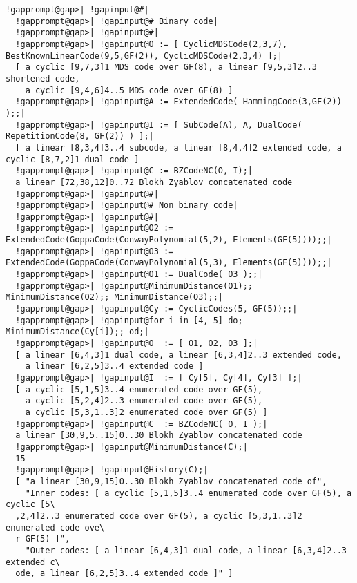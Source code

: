 \documentclass[a4paper,11pt]{report}
\begin{document}
{{ 
\begin{Verbatim}[commandchars=!@|,fontsize=\small,frame=single,label=Example]
  !gapprompt@gap>| !gapinput@#|
  !gapprompt@gap>| !gapinput@# Binary code|
  !gapprompt@gap>| !gapinput@#|
  !gapprompt@gap>| !gapinput@O := [ CyclicMDSCode(2,3,7), BestKnownLinearCode(9,5,GF(2)), CyclicMDSCode(2,3,4) ];|
  [ a cyclic [9,7,3]1 MDS code over GF(8), a linear [9,5,3]2..3 shortened code, 
    a cyclic [9,4,6]4..5 MDS code over GF(8) ]
  !gapprompt@gap>| !gapinput@A := ExtendedCode( HammingCode(3,GF(2)) );;|
  !gapprompt@gap>| !gapinput@I := [ SubCode(A), A, DualCode( RepetitionCode(8, GF(2)) ) ];|
  [ a linear [8,3,4]3..4 subcode, a linear [8,4,4]2 extended code, a cyclic [8,7,2]1 dual code ]
  !gapprompt@gap>| !gapinput@C := BZCodeNC(O, I);|
  a linear [72,38,12]0..72 Blokh Zyablov concatenated code
  !gapprompt@gap>| !gapinput@#|
  !gapprompt@gap>| !gapinput@# Non binary code|
  !gapprompt@gap>| !gapinput@#|
  !gapprompt@gap>| !gapinput@O2 := ExtendedCode(GoppaCode(ConwayPolynomial(5,2), Elements(GF(5))));;|
  !gapprompt@gap>| !gapinput@O3 := ExtendedCode(GoppaCode(ConwayPolynomial(5,3), Elements(GF(5))));;|
  !gapprompt@gap>| !gapinput@O1 := DualCode( O3 );;|
  !gapprompt@gap>| !gapinput@MinimumDistance(O1);; MinimumDistance(O2);; MinimumDistance(O3);;|
  !gapprompt@gap>| !gapinput@Cy := CyclicCodes(5, GF(5));;|
  !gapprompt@gap>| !gapinput@for i in [4, 5] do; MinimumDistance(Cy[i]);; od;|
  !gapprompt@gap>| !gapinput@O  := [ O1, O2, O3 ];|
  [ a linear [6,4,3]1 dual code, a linear [6,3,4]2..3 extended code,
    a linear [6,2,5]3..4 extended code ]
  !gapprompt@gap>| !gapinput@I  := [ Cy[5], Cy[4], Cy[3] ];|
  [ a cyclic [5,1,5]3..4 enumerated code over GF(5),
    a cyclic [5,2,4]2..3 enumerated code over GF(5),
    a cyclic [5,3,1..3]2 enumerated code over GF(5) ]
  !gapprompt@gap>| !gapinput@C  := BZCodeNC( O, I );|
  a linear [30,9,5..15]0..30 Blokh Zyablov concatenated code
  !gapprompt@gap>| !gapinput@MinimumDistance(C);|
  15
  !gapprompt@gap>| !gapinput@History(C);|
  [ "a linear [30,9,15]0..30 Blokh Zyablov concatenated code of",
    "Inner codes: [ a cyclic [5,1,5]3..4 enumerated code over GF(5), a cyclic [5\
  ,2,4]2..3 enumerated code over GF(5), a cyclic [5,3,1..3]2 enumerated code ove\
  r GF(5) ]",
    "Outer codes: [ a linear [6,4,3]1 dual code, a linear [6,3,4]2..3 extended c\
  ode, a linear [6,2,5]3..4 extended code ]" ]
\end{Verbatim}
  }

 }

 
\end{document}
